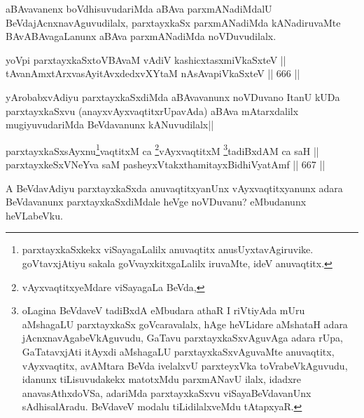 \begin{artha} 
aBAvavanenx boVdhisuvudariMda aBAva parxmANadiMdalU\break
BeVdajAcnxnavAguvudilalx, parxtayxkaSx parxmANadiMda kANadiruvaMte\break
BAvABAvagaLanunx aBAva parxmANadiMda noVDuvudilalx.
\end{artha}


\begin{shl}
yoV\s pi parxtayxkaSxtoV\s BAvaM vAdiV kashicxtasxmiVkaSxteV || \\
tAvanAmxtArxvasAyitAvxdedxvXYtaM nAsAvapiVkaSxteV \hfill || 666 ||  
\end{shl}

\begin{artha} 
yArobabxvAdiyu parxtayxkaSxdiMda aBAvavanunx noVDuvano ItanU kUDa 
parxtayxkaSxvu (anayxvAyxvaqtitxrUpavAda) aBAva mAtarxdalilx 
mugiyuvudariMda BeVdavanunx kANuvudilalx||
\end{artha}


\begin{shl}
parxtayxkaSxsAyxnu\footnote{parxtayxkaSxkekx viSayagaLalilx anuvaqtitx anusUyxtavAgiruvike. goVtavxjAtiyu sakala goVvayxkitxgaLalilx 
iruvaMte, ideV anuvaqtitx.}vaqtitxM ca \footnote{vAyxvaqtitxyeMdare viSayagaLa BeVda,}vAyxvaqtitxM \footnote{oLagina BeVdaveV tadiBxdA eMbudara athaR \ndash I riVtiyAda mUru aMshagaLU parxtayxkaSx goVcaravalalx, hAge heVLidare aMshataH adara jAcnxnavAgabeVkAguvudu, GaTavu parxtayxkaSxvAguvAga adara rUpa, GaTatavxjAti itAyxdi aMshagaLU parxtayxkaSxvAguvaMte anuvaqtitx, vAyxvaqtitx, avAMtara BeVda ivelalxvU parxteyxVka toVrabeVkAguvudu, idanunx tiLisuvudakekx matotxMdu parxmANavU ilalx, idadxre anavasAthxdoVSa, adariMda parxtayxkaSxvu viSayaBeVdavanUnx sAdhisalAradu. BeVdaveV modalu tiLidilalxveMdu tAtapxyaR.}tadiBxdAM ca saH || \\
parxtayxkeSxVNeYva saM pasheyxVtakxthamitayxBidhiVyatAmf \hfill || 667 ||  
\end{shl}

\begin{artha}
A BeVdavAdiyu parxtayxkaSxda anuvaqtitxyanUnx vAyxvaqtitxyanunx adara 
BeVdavanunx parxtayxkaSxdiMdale heVge noVDuvanu? eMbudanunx heVLabeVku.
\end{artha}

